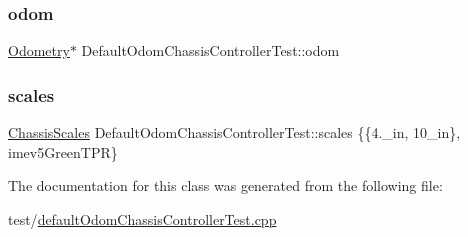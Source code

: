 \mbox{\label{classDefaultOdomChassisControllerTest_adffa3b2fca0b03a6efc3f95b4339af4a}} 
\subsubsection{\texorpdfstring{odom}{odom}}
{\footnotesize\ttfamily \mbox{\hyperlink{classokapi_1_1Odometry}{Odometry}}$\ast$ Default\+Odom\+Chassis\+Controller\+Test\+::odom\hspace{0.3cm}{\ttfamily [protected]}}

\mbox{\label{classDefaultOdomChassisControllerTest_a9f6e35a3b24a79f9e4686bb0c87de371}} 
\subsubsection{\texorpdfstring{scales}{scales}}
{\footnotesize\ttfamily \mbox{\hyperlink{classokapi_1_1ChassisScales}{Chassis\+Scales}} Default\+Odom\+Chassis\+Controller\+Test\+::scales \{\{4.\+\_\+in, 10\+\_\+in\}, imev5\+Green\+T\+P\+R\}\hspace{0.3cm}{\ttfamily [protected]}}



The documentation for this class was generated from the following file\+:\begin{DoxyCompactItemize}
\item 
test/\mbox{\hyperlink{defaultOdomChassisControllerTest_8cpp}{default\+Odom\+Chassis\+Controller\+Test.\+cpp}}\end{DoxyCompactItemize}
